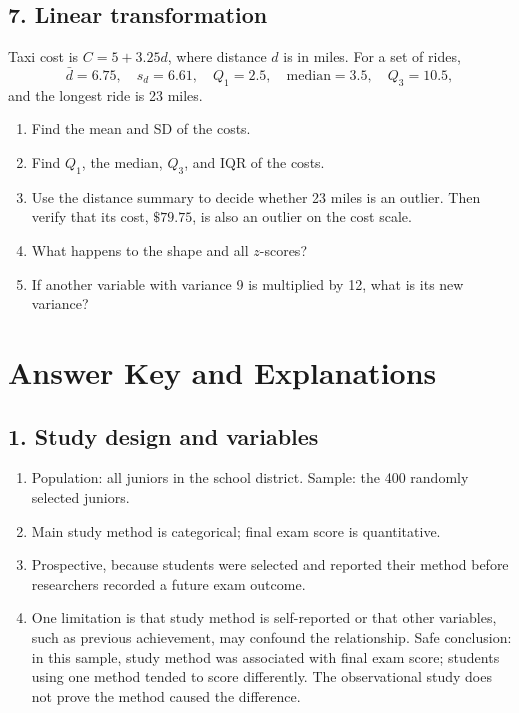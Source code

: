 \documentclass[11pt]{article}
\newcommand{\ans}[1]{\textcolor{AnswerBlue}{#1}}
\newcommand{\longwork}{\vspace{0.55in}\hrulefill}
\begin{document}
\subsection*{7. Linear transformation}
Taxi cost is $C=5+3.25d$, where distance $d$ is in miles. For a set of rides,
\[
\bar d=6.75,\quad s_d=6.61,\quad Q_1=2.5,\quad \text{median}=3.5,\quad Q_3=10.5,
\]
and the longest ride is 23 miles.

\begin{enumerate}[label=\alph*.]
  \item Find the mean and SD of the costs.
  \item Find $Q_1$, the median, $Q_3$, and IQR of the costs.
  \item Use the distance summary to decide whether 23 miles is an outlier. Then verify that its cost, $\$79.75$, is also an outlier on the cost scale.
  \item What happens to the shape and all $z$-scores?
  \item If another variable with variance 9 is multiplied by 12, what is its new variance?
\end{enumerate}
\longwork

\newpage
\section{Answer Key and Explanations}

\subsection*{1. Study design and variables}
\begin{answerbox}
\begin{enumerate}[label=\alph*.]
  \item \ans{Population: all juniors in the school district. Sample: the 400 randomly selected juniors.}
  \item \ans{Main study method is categorical; final exam score is quantitative.}
  \item \ans{Prospective, because students were selected and reported their method before researchers recorded a future exam outcome.}
  \item \ans{One limitation is that study method is self-reported or that other variables, such as previous achievement, may confound the relationship. Safe conclusion: in this sample, study method was associated with final exam score; students using one method tended to score differently. The observational study does not prove the method caused the difference.}
\end{enumerate}
\end{answerbox}
\end{document}
